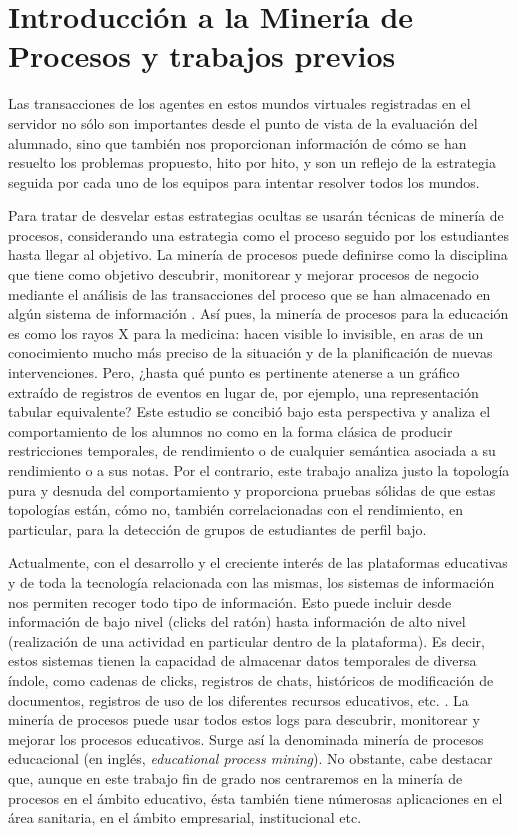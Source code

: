 \chapter{Introducción a la Minería de Procesos y trabajos previos}

Las transacciones de los agentes en estos mundos virtuales registradas en el servidor no sólo son importantes desde el punto de vista de la evaluación del alumnado, sino que también nos proporcionan información de cómo se han resuelto los problemas propuesto, hito por hito, y son un reflejo de la estrategia seguida por cada uno de los equipos para intentar resolver todos los mundos.

Para tratar de desvelar estas estrategias ocultas se usarán técnicas de minería de procesos, considerando una estrategia como el proceso seguido por los estudiantes hasta llegar al objetivo. La minería de procesos puede definirse como la disciplina que tiene como objetivo descubrir, monitorear y mejorar procesos de negocio mediante el análisis de las transacciones del proceso que se han almacenado en algún sistema de información \citep{Mayorga_2015}. Así pues, la minería de procesos para la educación es como los rayos X para la medicina: hacen visible lo invisible, en aras de un conocimiento mucho más preciso de la situación y de la planificación de nuevas intervenciones. Pero, ¿hasta qué punto es pertinente atenerse a un gráfico extraído de registros de eventos en lugar de, por ejemplo, una representación tabular equivalente? Este estudio se concibió bajo esta perspectiva y analiza el comportamiento de los alumnos no como en la forma clásica de producir restricciones temporales, de rendimiento o de cualquier semántica asociada a su rendimiento o a sus notas. Por el contrario, este trabajo analiza justo la topología pura y desnuda del comportamiento y proporciona pruebas sólidas de que estas topologías están, cómo no, también correlacionadas con el rendimiento, en particular, para la detección de grupos de estudiantes de perfil bajo.

Actualmente, con el desarrollo y el creciente interés de las plataformas educativas y de toda la tecnología relacionada con las mismas, los sistemas de información nos permiten recoger todo tipo de información. Esto puede incluir desde información de bajo nivel (clicks del ratón) hasta información de alto nivel (realización de una actividad en particular dentro de la plataforma). Es decir, estos sistemas tienen la capacidad de almacenar datos temporales de diversa índole, como cadenas de clicks, registros de chats, históricos de modificación de documentos, registros de uso de los diferentes recursos educativos, etc. \cite{bogarin2018survey}. La minería de procesos puede usar todos estos logs para descubrir, monitorear y mejorar los procesos educativos. Surge así la denominada minería de procesos educacional (en inglés, \emph{educational process mining}). No obstante, cabe destacar que, aunque en este trabajo fin de grado nos centraremos en la minería de procesos en el ámbito educativo, ésta también tiene númerosas aplicaciones en el área sanitaria, en el ámbito empresarial, institucional etc.

